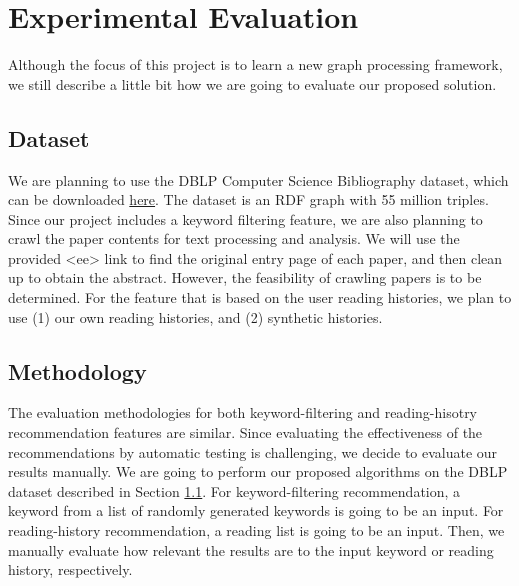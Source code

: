 \section{Experimental Evaluation}
%
Although the focus of this project is to learn a new graph processing framework, we still describe a little bit how we are going to evaluate our proposed solution.
%
\subsection{Dataset} \label{dataset}
%
We are planning to use the DBLP Computer Science Bibliography dataset, which can be downloaded \href{http://www.rdfhdt.org/datasets/}{here}. %
%
The dataset is an RDF graph with 55 million triples.
%
Since our project includes a keyword filtering feature, we are also planning to crawl the paper contents for text processing and analysis.
%
We will use the provided <ee> link to find the original entry page of each paper, and then clean up to obtain the abstract.
%
However, the feasibility of crawling papers is to be determined.
%
For the feature that is based on the user reading histories, we plan to use (1) our own reading histories, and (2) synthetic histories.
%
\subsection{Methodology}
%
The evaluation methodologies for both keyword-filtering and reading-hisotry recommendation features are similar.
%
Since evaluating the effectiveness of the recommendations by automatic testing is challenging, we decide to evaluate our results manually.
%
We are going to perform our proposed algorithms on the DBLP dataset described in Section \ref{dataset}.
%
For keyword-filtering recommendation, a keyword from a list of randomly generated keywords is going to be an input.
%
For reading-history recommendation, a reading list is going to be an input.
%
Then, we manually evaluate how relevant the results are to the input keyword or reading history, respectively.
%
